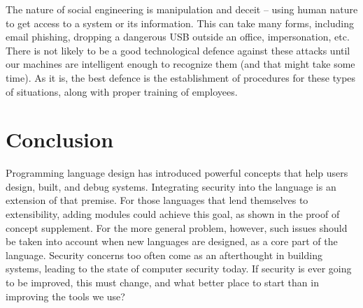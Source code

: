 \documentclass[twocolumn]{article}
\begin{document}
The nature of social engineering is manipulation and deceit -- using human nature to get access to a system or its information.  This can take many forms, including email phishing, dropping a dangerous USB outside an office, impersonation, etc.  There is not likely to be a good technological defence against these attacks until our machines are intelligent enough to recognize them (and that might take some time).  As it is, the best defence is the establishment of procedures for these types of situations, along with proper training of employees.


\section{Conclusion}
Programming language design has introduced powerful concepts that help users design, built, and debug systems.  Integrating security into the language is an extension of that premise.  For those languages that lend themselves to extensibility, adding modules could achieve this goal, as shown in the proof of concept supplement.  For the more general problem, however, such issues should be taken into account when new languages are designed, as a core part of the language.  Security concerns too often come as an afterthought in building systems, leading to the state of computer security today.  If security is ever going to be improved, this must change, and what better place to start than in improving the tools we use?
\end{document}
